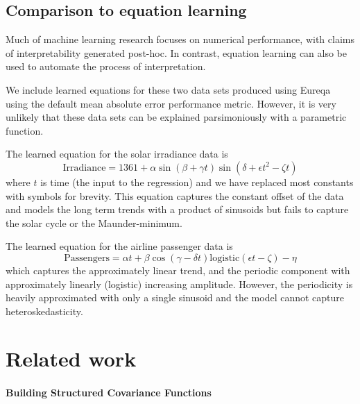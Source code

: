 \documentclass{article}
\begin{document}
\subsection{Comparison to equation learning}

Much of machine learning research focuses on numerical performance, with claims of interpretability generated post-hoc.
In contrast, equation learning \citep{Schmidt2009b} can also be used to automate the process of interpretation.

We include learned equations for these two data sets produced using Eureqa \citep{Eureqa} using the default mean absolute error performance metric\footnotemark.
However, it is very unlikely that these data sets can be explained parsimoniously with a parametric function.

The learned equation for the solar irradiance data is
\begin{equation}
\textrm{Irradiance} = 1361 + \alpha\sin(\beta + \gamma t)\sin(\delta + \epsilon t^2 - \zeta t)
\end{equation}
where $t$ is time (the input to the regression) and we have replaced most constants with symbols for brevity.
This equation captures the constant offset of the data and models the long term trends with a product of sinusoids but fails to capture the solar cycle or the Maunder-minimum.

The learned equation for the airline passenger data is
\begin{equation}
\textrm{Passengers} = \alpha t + \beta\cos(\gamma - \delta t)\textrm{logistic}(\epsilon t - \zeta) - \eta
\end{equation}
which captures the approximately linear trend, and the periodic component with approximately linearly (logistic) increasing amplitude.
However, the periodicity is heavily approximated with only a single sinusoid and the model cannot capture heteroskedasticity.

\section{Related work}

\paragraph{Building Structured Covariance Functions}
\end{document}
